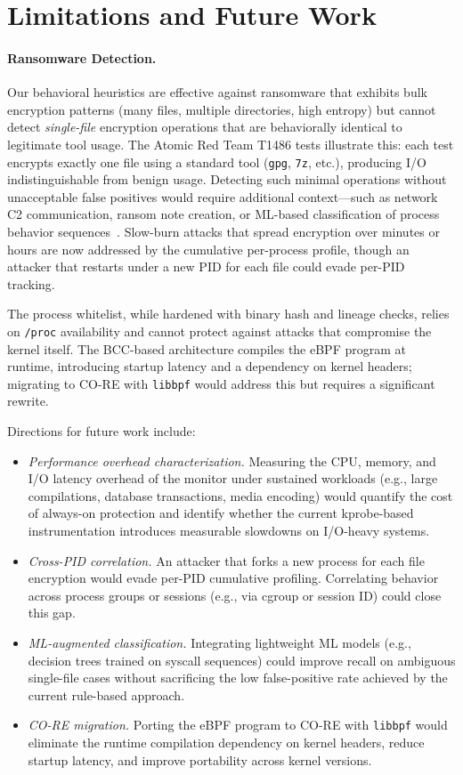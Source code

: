 \documentclass[twocolumn, 10pt]{scrartcl}
\begin{document}
\section{Limitations and Future Work}

\paragraph{Ransomware Detection.}
Our behavioral heuristics are effective against ransomware that exhibits bulk encryption patterns (many files, multiple directories, high entropy) but cannot detect \emph{single-file} encryption operations that are behaviorally identical to legitimate tool usage. The Atomic Red Team T1486 tests illustrate this: each test encrypts exactly one file using a standard tool (\texttt{gpg}, \texttt{7z}, etc.), producing I/O indistinguishable from benign usage. Detecting such minimal operations without unacceptable false positives would require additional context---such as network C2 communication, ransom note creation, or ML-based classification of process behavior sequences~\cite{philippart2024}. Slow-burn attacks that spread encryption over minutes or hours are now addressed by the cumulative per-process profile, though an attacker that restarts under a new PID for each file could evade per-PID tracking.

The process whitelist, while hardened with binary hash and lineage checks, relies on \texttt{/proc} availability and cannot protect against attacks that compromise the kernel itself. The BCC-based architecture compiles the eBPF program at runtime, introducing startup latency and a dependency on kernel headers; migrating to CO-RE with \texttt{libbpf} would address this but requires a significant rewrite.

Directions for future work include:
\begin{itemize}
    \item \textit{Performance overhead characterization.} Measuring the CPU, memory, and I/O latency overhead of the monitor under sustained workloads (e.g., large compilations, database transactions, media encoding) would quantify the cost of always-on protection and identify whether the current kprobe-based instrumentation introduces measurable slowdowns on I/O-heavy systems.
    \item \textit{Cross-PID correlation.} An attacker that forks a new process for each file encryption would evade per-PID cumulative profiling. Correlating behavior across process groups or sessions (e.g., via cgroup or session ID) could close this gap.
    \item \textit{ML-augmented classification.} Integrating lightweight ML models (e.g., decision trees trained on syscall sequences) could improve recall on ambiguous single-file cases without sacrificing the low false-positive rate achieved by the current rule-based approach.
    \item \textit{CO-RE migration.} Porting the eBPF program to CO-RE with \texttt{libbpf} would eliminate the runtime compilation dependency on kernel headers, reduce startup latency, and improve portability across kernel versions.
\end{itemize}
\end{document}
